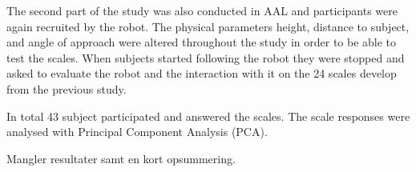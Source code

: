 The second part of the study was also conducted in AAL and participants were again recruited by the robot. The physical parameters height, distance to subject, and angle of approach were altered throughout the study in order to be able to test the scales. When subjects started following the robot they were stopped and asked to evaluate the robot and the interaction with it on the 24 scales develop from the previous study. 

In total 43 subject participated and answered the scales. The scale responses were analysed with Principal Component Analysis (PCA). 

{\color{red} Mangler resultater samt en kort opsummering.}

